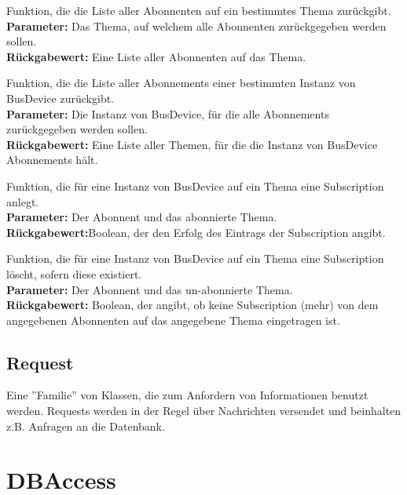 \documentclass[entwurf.tex]{subfiles}
\begin{document}
		\begin{description}
		Funktion, die die Liste aller Abonnenten auf ein bestimmtes Thema zurückgibt. \\
		\textbf{Parameter:} Das Thema, auf welchem alle Abonnenten zurückgegeben werden sollen.	\\
		\textbf{Rückgabewert:} Eine Liste aller Abonnenten auf das Thema.	
		

		Funktion, die die Liste aller Abonnements einer bestimmten Instanz von BusDevice zurückgibt. \\
		\textbf{Parameter:} Die Instanz von BusDevice, für die alle Abonnements zurückgegeben werden sollen.	\\
		\textbf{Rückgabewert:} Eine Liste aller Themen, für die die Instanz von BusDevice Abonnements hält. 	
		
		Funktion, die für eine Instanz von BusDevice auf ein Thema eine Subscription anlegt. \\
		\textbf{Parameter:} Der Abonnent und das abonnierte Thema. \\
		\textbf{Rückgabewert:}Boolean, der den Erfolg des Eintrags der Subscription angibt. 
		
		Funktion, die für eine Instanz von BusDevice auf ein Thema eine Subscription löscht, sofern diese existiert. \\
		\textbf{Parameter:} Der Abonnent und das un-abonnierte Thema. \\
		\textbf{Rückgabewert:} Boolean, der angibt, ob keine Subscription (mehr) von dem angegebenen Abonnenten auf das angegebene Thema eingetragen ist. 
		\end{description}
		
		\subsection{Request}
		\label{ClassFamily:Request}
		Eine ''Familie'' von Klassen, die zum Anfordern von Informationen benutzt werden. Requests werden in der Regel über Nachrichten versendet und beinhalten z.B. Anfragen an die Datenbank.
		
		
	\section{DBAccess}
\end{document}

